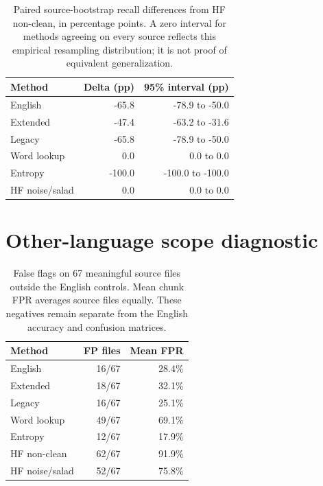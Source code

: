 \documentclass[10pt,a4paper,twocolumn]{article}
\begin{document}
\begin{table}[htbp]
\centering
\small
\caption{Paired source-bootstrap recall differences from HF non-clean, in
percentage points. A zero interval for methods agreeing on every source
reflects this empirical resampling distribution; it is not proof of
equivalent generalization.}
\begin{tabular}{@{}lrr@{}}
\toprule
Method & Delta (pp) & 95\% interval (pp) \\
\midrule
English & -65.8 & -78.9 to -50.0 \\
Extended & -47.4 & -63.2 to -31.6 \\
Legacy & -65.8 & -78.9 to -50.0 \\
Word lookup & 0.0 & 0.0 to 0.0 \\
Entropy & -100.0 & -100.0 to -100.0 \\
HF noise/salad & 0.0 & 0.0 to 0.0 \\
\bottomrule
\end{tabular}
\end{table}

\clearpage

\setcounter{table}{0}
\setcounter{figure}{0}

\section{Other-language scope
diagnostic}\label{other-language-scope-diagnostic}

\begin{table}[htbp]
\centering
\small
\caption{False flags on 67 meaningful source files outside the English controls.
Mean chunk FPR averages source files equally. These negatives remain
separate from the English accuracy and confusion matrices.}
\begin{tabular}{@{}lrr@{}}
\toprule
Method & FP files & Mean FPR \\
\midrule
English & 16/67 & 28.4\% \\
Extended & 18/67 & 32.1\% \\
Legacy & 16/67 & 25.1\% \\
Word lookup & 49/67 & 69.1\% \\
Entropy & 12/67 & 17.9\% \\
HF non-clean & 62/67 & 91.9\% \\
HF noise/salad & 52/67 & 75.8\% \\
\bottomrule
\end{tabular}
\end{table}
\end{document}
